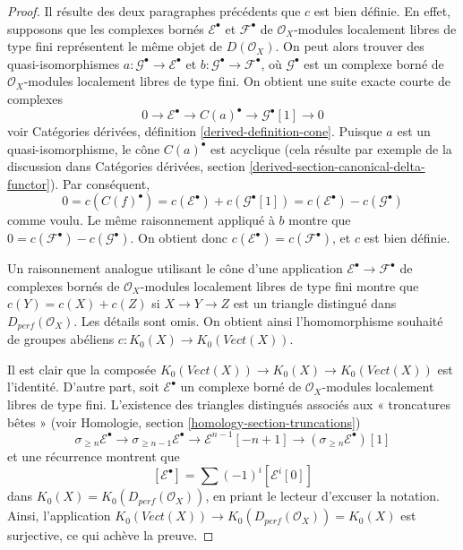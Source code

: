 \begin{proof}
\medskip\noindent
Il résulte des deux paragraphes précédents que $c$
est bien définie. En effet, supposons que les complexes bornés
$\mathcal{E}^\bullet$ et $\mathcal{F}^\bullet$ de $\mathcal{O}_X$-modules localement libres
de type fini représentent le même objet de $D(\mathcal{O}_X)$.
On peut alors trouver des quasi-isomorphismes
$a : \mathcal{G}^\bullet \to \mathcal{E}^\bullet$ et
$b : \mathcal{G}^\bullet \to \mathcal{F}^\bullet$,
où $\mathcal{G}^\bullet$ est un complexe borné de $\mathcal{O}_X$-modules localement libres
de type fini.
On obtient une suite exacte courte de complexes
$$
0 \to \mathcal{E}^\bullet \to C(a)^\bullet \to \mathcal{G}^\bullet[1] \to 0
$$
voir Catégories dérivées, définition \ref{derived-definition-cone}.
Puisque $a$ est un quasi-isomorphisme, le cône $C(a)^\bullet$ est
acyclique (cela résulte par exemple de la discussion dans
Catégories dérivées, section \ref{derived-section-canonical-delta-functor}).
Par conséquent,
$$
0 = c(C(f)^\bullet) = c(\mathcal{E}^\bullet) + c(\mathcal{G}^\bullet[1]) =
c(\mathcal{E}^\bullet) - c(\mathcal{G}^\bullet)
$$
comme voulu. Le même raisonnement appliqué à $b$ montre que
$0 = c(\mathcal{F}^\bullet) - c(\mathcal{G}^\bullet)$.
On obtient donc $c(\mathcal{E}^\bullet) = c(\mathcal{F}^\bullet)$,
et $c$ est bien définie.

\medskip\noindent
Un raisonnement analogue utilisant le cône d'une application
$\mathcal{E}^\bullet \to \mathcal{F}^\bullet$
de complexes bornés de $\mathcal{O}_X$-modules localement libres de type fini
montre que $c(Y) = c(X) + c(Z)$ si $X \to Y \to Z$ est un triangle distingué
dans $D_{perf}(\mathcal{O}_X)$. Les détails sont omis.
On obtient ainsi l'homomorphisme souhaité
de groupes abéliens $c : K_0(X) \to K_0(\textit{Vect}(X))$.

\medskip\noindent
Il est clair que la composée
$K_0(\textit{Vect}(X)) \to K_0(X) \to K_0(\textit{Vect}(X))$
est l'identité. D'autre part, soit $\mathcal{E}^\bullet$
un complexe borné de $\mathcal{O}_X$-modules localement libres de type fini.
L'existence des triangles distingués associés aux « troncatures bêtes »
(voir Homologie, section \ref{homology-section-truncations})
$$
\sigma_{\geq n}\mathcal{E}^\bullet \to
\sigma_{\geq n - 1}\mathcal{E}^\bullet \to
\mathcal{E}^{n - 1}[-n + 1] \to
(\sigma_{\geq n}\mathcal{E}^\bullet)[1]
$$
et une récurrence montrent que
$$
[\mathcal{E}^\bullet] = \sum (-1)^i[\mathcal{E}^i[0]]
$$
dans $K_0(X) = K_0(D_{perf}(\mathcal{O}_X))$, en priant le lecteur d'excuser la notation.
Ainsi, l'application $K_0(\textit{Vect}(X)) \to K_0(D_{perf}(\mathcal{O}_X)) = K_0(X)$
est surjective, ce qui achève la preuve.
\end{proof}

